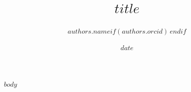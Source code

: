 \documentclass[10pt,a4paper]{article}
\title{\sffamily\bfseries $title$}
\author[$authors.affiliation$]{$authors.name$$if(authors.orcid)$\,\orcidlink{$authors.orcid$}$endif$}
\affil[$affiliations.index$]{\small $affiliations.name$}
\date{\small $date$}
\begin{document}
\maketitle
\thispagestyle{fancy}

$body$
\end{document}
